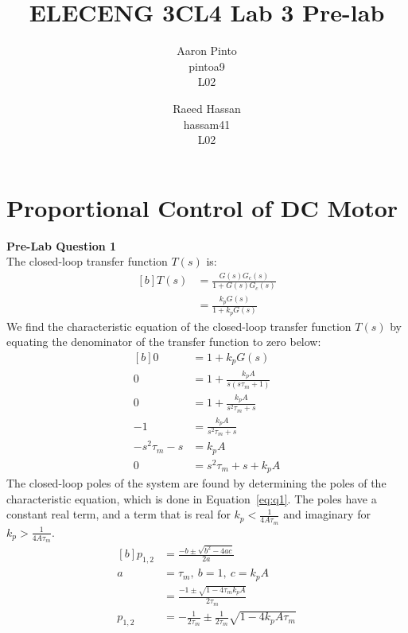 \documentclass[12pt]{article}
\title{ELECENG 3CL4 Lab 3 Pre-lab}
\author{
    Aaron Pinto \\
    pintoa9 \\
    L02
    \and
    Raeed Hassan \\
    hassam41 \\
    L02
}
\begin{document}
\maketitle
\clearpage

\section{Proportional Control of DC Motor}
\textbf{Pre-Lab Question 1} \\
The closed-loop transfer function $T(s)$ is:
\begin{equation*}
\begin{aligned}[b]
    T(s) &= \frac{G(s)G_c(s)}{1 + G(s)G_c(s)} \\
    &= \frac{k_pG(s)}{1 + k_pG(s)}
\end{aligned}
\end{equation*}
We find the characteristic equation of the closed-loop transfer function $T(s)$ by equating the denominator of the transfer function to zero below: 
\begin{equation*}
\begin{aligned}[b]
    0 &= 1 + k_pG(s) \\
    0 &= 1 + \frac{k_pA}{s(s\tau_m + 1)} \\
    0 &= 1 + \frac{k_pA}{s^2\tau_m + s} \\
    -1 &= \frac{k_pA}{s^2\tau_m + s} \\
    -s^2\tau_m - s &= k_pA \\
    0 &= s^2\tau_m + s + k_pA
\end{aligned}
\end{equation*}
The closed-loop poles of the system are found by determining the poles of the characteristic equation, which is done in Equation~\ref{eq:q1}. The poles have a constant real term, and a term that is real for $k_p < \frac{1}{4A\tau_m}$ and imaginary for $k_p > \frac{1}{4A\tau_m}$. 
\begin{equation} \label{eq:q1}
\begin{aligned}[b]
    p_{1,2} &= \frac{-b \pm \sqrt{b^2 - 4ac}}{2a} \\
    a &= \tau_m, \ b = 1, \ c = k_pA \\
    &= \frac{-1 \pm \sqrt{1 - 4\tau_m k_p A}}{2\tau_m} \\
    p_{1,2} &= -\frac{1}{2\tau_m} \pm \frac{1}{2\tau_m}\sqrt{1 - 4k_p A \tau_m}
\end{aligned}
\end{equation}
\end{document}
